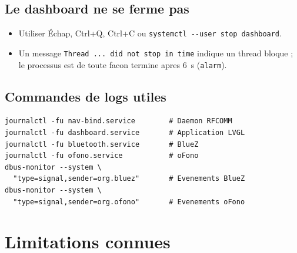 \documentclass[a4paper,11pt]{article}
\begin{document}
\subsection{Le dashboard ne se ferme pas}

\begin{itemize}
  \item Utiliser Échap, Ctrl+Q, Ctrl+C ou \texttt{systemctl -{}-user stop dashboard}.
  \item Un message \texttt{Thread ... did not stop in time} indique un thread bloque ;
    le processus est de toute facon termine apres 6~s (\texttt{alarm}).
\end{itemize}

\subsection{Commandes de logs utiles}

\begin{lstlisting}[style=bashcode]
journalctl -fu nav-bind.service        # Daemon RFCOMM
journalctl -fu dashboard.service       # Application LVGL
journalctl -fu bluetooth.service       # BlueZ
journalctl -fu ofono.service           # oFono
dbus-monitor --system \
  "type=signal,sender=org.bluez"       # Evenements BlueZ
dbus-monitor --system \
  "type=signal,sender=org.ofono"       # Evenements oFono
\end{lstlisting}

\section{Limitations connues}
\end{document}
